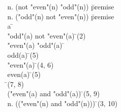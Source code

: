 \documentclass{article}
\begin{document}
\begin{proofbox}
\: \forall n. (not "even"(n) \rightarrow "odd"(n)) \= \hbox{premise} \\
\: \forall n. ("odd"(n) \rightarrow not "even"(n)) \= \hbox{premise} \\
\open
\: a \= \forallintroconst \\
\: "odd"(a) \rightarrow not "even"(a) \= \forallelim(2) \\
\open
\: "even"(a) \land "odd"(a) \= \asm \\
\: odd(a) \= \andelim(5) \\
\: \lnot "even"(a) \= \implieselim(4, 6) \\
\: even(a) \= \andelim(5) \\
\: \bot \= \notelim(7, 8) \\
\close
\: \lnot ("even"(a) and "odd"(a)) \= \notintro(5, 9) \\
\close
\: \forall n. (\lnot ("even"(n) and "odd"(n))) \= \forallintro(3, 10) \\
\end{proofbox}
\end{document}
